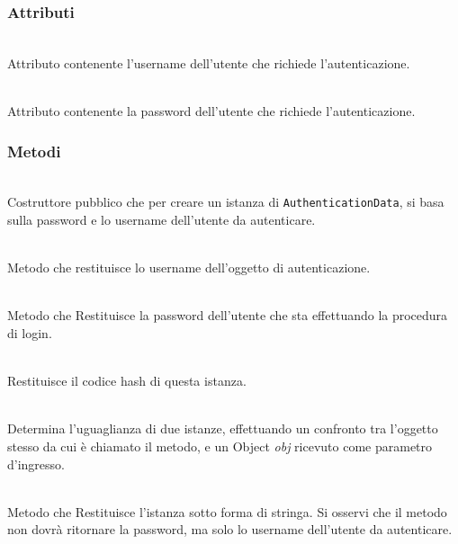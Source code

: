 \subsubsection*{Attributi}
\begin{description}
  \item{}\\
	Attributo contenente l'username dell'utente che richiede l'autenticazione.
  \item{}\\
	Attributo contenente la password dell'utente che richiede l'autenticazione.
\end{description}

\subsubsection*{Metodi}
\begin{description}
	\item{}\\
	Costruttore pubblico che per creare un istanza di \texttt{AuthenticationData}, si basa sulla password e lo username dell'utente da autenticare.

	\item{}\\
	Metodo che restituisce lo username dell'oggetto di autenticazione.
	
	\item{}\\
	Metodo che Restituisce la password dell'utente che sta effettuando la procedura di login.

	\item{}\\
	Restituisce il codice hash di questa istanza.
	
	\item{}\\
	Determina l'uguaglianza di due istanze, effettuando un confronto tra l'oggetto stesso da cui è chiamato il metodo, e un Object \textit{obj} ricevuto come parametro d'ingresso.
	
	\item{}\\
	Metodo che Restituisce l'istanza sotto forma di stringa. Si osservi che il metodo non dovrà ritornare la password, ma solo lo username dell'utente da autenticare.

\end{description}

